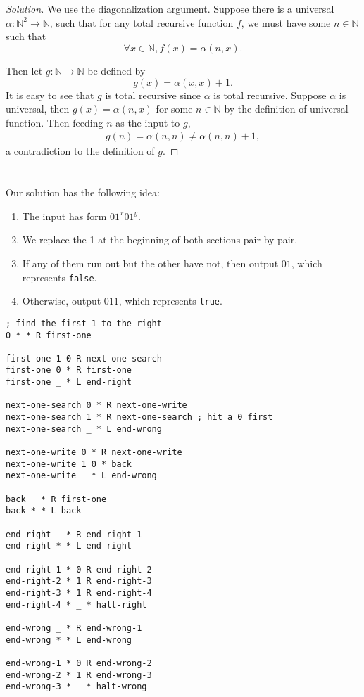 \documentclass{article}
\title{\mytitle}
\author{\myname}
\date{\today}
\theoremstyle{plain}
\newcommand{\N}{\mathbb{N}}
\begin{document}
\maketitle
\section{}
\begin{proof}[Solution]
We use the diagonalization argument. Suppose there is a universal $\alpha:\N^{2}\to\N$,
such that for any total recursive function $f$, we must have some $n\in\N$ such
that \[\forall x\in\N, f(x) = \alpha(n, x).\]

Then let $g:\N\to\N$ be defined by \[g(x) = \alpha(x, x) + 1.\] It is easy to see that
$g$ is total recursive since $\alpha$ is total recursive. Suppose $\alpha$ is universal,
then $g(x) = \alpha(n, x)$ for some $n\in\N$ by the definition of universal function.
Then feeding $n$ as the input to $g$,
\begin{align*}
  g(n) = \alpha(n,n) \ne \alpha(n,n) + 1,
\end{align*}
a contradiction to the definition of $g$.
\end{proof}

\section{}
\subsubsection{}
Our solution has the following idea:
\begin{enumerate}
  \item The input has form $01^{x}01^{y}$.
  \item We replace the 1 at the beginning of both sections pair-by-pair.
  \item If any of them run out but the other have not, then output $01$, which
        represents \verb|false|.
  \item Otherwise, output $011$, which represents \verb|true|.
\end{enumerate}
\begin{verbatim}
; find the first 1 to the right
0 * * R first-one

first-one 1 0 R next-one-search
first-one 0 * R first-one
first-one _ * L end-right

next-one-search 0 * R next-one-write
next-one-search 1 * R next-one-search ; hit a 0 first
next-one-search _ * L end-wrong

next-one-write 0 * R next-one-write
next-one-write 1 0 * back
next-one-write _ * L end-wrong

back _ * R first-one
back * * L back

end-right _ * R end-right-1
end-right * * L end-right

end-right-1 * 0 R end-right-2
end-right-2 * 1 R end-right-3
end-right-3 * 1 R end-right-4
end-right-4 * _ * halt-right

end-wrong _ * R end-wrong-1
end-wrong * * L end-wrong

end-wrong-1 * 0 R end-wrong-2
end-wrong-2 * 1 R end-wrong-3
end-wrong-3 * _ * halt-wrong
\end{verbatim}
\end{document}
